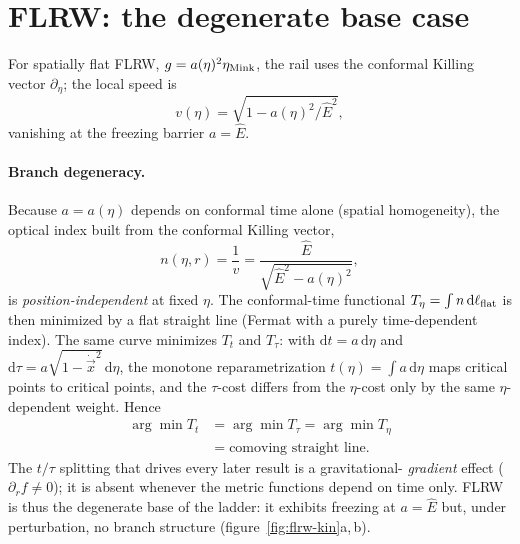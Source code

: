 \documentclass[12pt]{iopart}
\newcommand{\Ehat}{\hat E}
\newcommand{\dd}{\mathrm{d}}
\begin{document}
\section{FLRW: the degenerate base case}
\label{sec:flrw}
For spatially flat FLRW, $g=a(\eta)^2\eta_{\rm Mink}$, the rail uses the
conformal Killing vector $\partial_\eta$; the local speed is
\begin{equation}
    v(\eta)=\sqrt{1-a(\eta)^2/\Ehat^{2}},
    \label{eq:flrwspeed}
\end{equation}
vanishing at the freezing barrier $a=\Ehat$.
\paragraph{Branch degeneracy.} Because $a=a(\eta)$ depends on conformal time
alone (spatial homogeneity), the optical index built from the conformal Killing
vector,
\begin{equation}
    n(\eta,r)=\frac1v=\frac{\Ehat}{\sqrt{\Ehat^2-a(\eta)^2}},
    \label{eq:flrwindex}
\end{equation}
is \emph{position-independent} at fixed $\eta$. The conformal-time functional
$T_\eta=\int n\,\dd\ell_{\rm flat}$ is then minimized by a flat straight line
(Fermat with a purely time-dependent index). The same curve minimizes $T_t$ and
$T_\tau$: with $\dd t=a\,\dd\eta$ and $\dd\tau=a\sqrt{1-\dot{\vec x}^2}\,\dd\eta$,
the monotone reparametrization $t(\eta)=\int a\,\dd\eta$ maps critical points to
critical points, and the $\tau$-cost differs from the $\eta$-cost only by the
same $\eta$-dependent weight. Hence
\begin{equation}
\begin{split}
    \arg\min T_t&=\arg\min T_\tau=\arg\min T_\eta\\
    &=\text{comoving straight line}.
\end{split}
    \label{eq:flrwdegen}
\end{equation}
The $t/\tau$ splitting that drives every later result is a gravitational-%
\emph{gradient} effect ($\partial_r f\neq0$); it is absent whenever the metric
functions depend on time only. FLRW is thus the degenerate base of the ladder:
it exhibits freezing at $a=\Ehat$ but, under perturbation, no branch structure
(figure~\ref{fig:flrw-kin}a,\,b).
\end{document}
